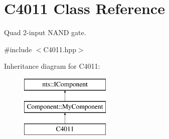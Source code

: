 \hypertarget{classC4011}{}\section{C4011 Class Reference}
\label{classC4011}


Quad 2-\/input N\+A\+ND gate.  




{\ttfamily \#include $<$C4011.\+hpp$>$}

Inheritance diagram for C4011\+:\begin{figure}[H]
\begin{center}
\leavevmode
\includegraphics[height=3.000000cm]{classC4011}
\end{center}
\end{figure}

